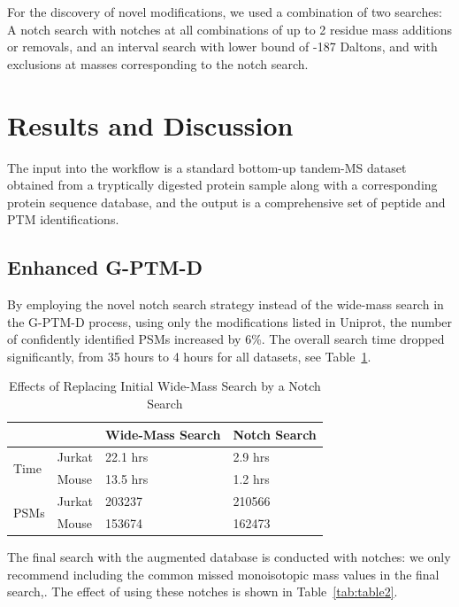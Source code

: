 \documentclass[journal=jprobs,manuscript=article]{achemso}
\begin{document}
For the discovery of novel modifications, we used a combination of two searches: A notch search with notches at all combinations of up to 2 residue mass additions or removals, and an interval search with lower bound of -187 Daltons, and with exclusions at masses corresponding to the notch search.

\section{Results and Discussion}

The input into the workflow is a standard bottom-up tandem-MS dataset obtained from a tryptically digested protein sample along with a corresponding protein sequence database, and the output is a comprehensive set of peptide and PTM identifications.
 
\subsection{Enhanced G-PTM-D}

By employing the novel notch search strategy instead of the wide-mass search in the G-PTM-D process, using only the modifications listed in Uniprot, the number of confidently identified PSMs increased by 6\%.
The overall search time dropped significantly, from 35 hours to 4 hours for all datasets, see Table~\ref{my-label}.

\begin{table}[]
\centering
\caption{Effects of Replacing Initial Wide-Mass Search by a Notch Search}
\label{my-label}
\begin{tabular}{ll|l|l}
                      &        & Wide-Mass Search & Notch Search\\
\hline
\multirow{2}{*}{Time} & Jurkat & 22.1 hrs         & 2.9 hrs    \\
                      & Mouse  & 13.5 hrs         & 1.2 hrs   \\
\hline
\multirow{2}{*}{PSMs} & Jurkat & 203237           & 210566    \\
                      & Mouse  & 153674           & 162473   
\end{tabular}
\end{table}


The final search with the augmented database is conducted with notches: we only recommend including the common missed monoisotopic mass values in the final search,.
The effect of using these notches is shown in Table~\ref{tab:table2}.
\end{document}
